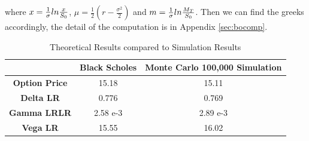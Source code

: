 \documentclass[11pt,a4paper,fleqn]{article}
\begin{document}
where $x = {1\over \sigma}ln {x\over S_0}$, $\mu=\frac{1}{2}(r-\frac{\sigma^2}{2})$ and $m = {1\over \sigma}ln {M_T\over S_0}$. Then we can find the greeks accordingly, the detail of the computation is in Appendix \ref{sec:bocomp}.\\


\begin{table}
\centering
\begin{subtable}{\textwidth}
  \centering
\begin{tabular}{|c|c|c|}
\hline
     & \textbf{Black Scholes} & \textbf{Monte Carlo 100,000 Simulation}\\ \hline
\textbf{Option Price} & 15.18 & 15.11 \\ \hline
\textbf{Delta LR} & 0.776 & 0.769\\ \hline
\textbf{Gamma LRLR} & 2.58 e-3 & 2.89 e-3\\ \hline
\textbf{Vega LR} &15.55 &16.02\\ \hline
\end{tabular}
\caption{Theoretical Results compared to Simulation Results}
\end{subtable}
\end{table}
\end{document}
